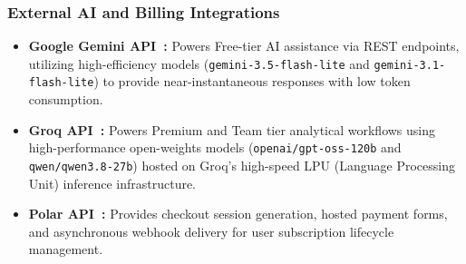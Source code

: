 \subsubsection{External AI and Billing Integrations}
\begin{itemize}[leftmargin=1.5em]
    \item \textbf{Google Gemini API~\cite{gemini2026}:} Powers Free-tier AI assistance via REST endpoints, utilizing high-efficiency models (\texttt{gemini-3.5-flash-lite} and \texttt{gemini-3.1-flash-lite}) to provide near-instantaneous responses with low token consumption.
    \item \textbf{Groq API~\cite{groq2026}:} Powers Premium and Team tier analytical workflows using high-performance open-weights models (\texttt{openai/gpt-oss-120b} and \texttt{qwen/qwen3.8-27b}) hosted on Groq's high-speed LPU (Language Processing Unit) inference infrastructure.
    \item \textbf{Polar API~\cite{polar2026}:} Provides checkout session generation, hosted payment forms, and asynchronous webhook delivery for user subscription lifecycle management.
\end{itemize}

